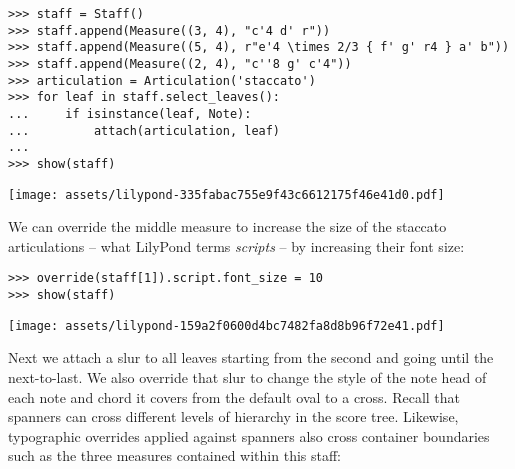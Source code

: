 \begin{abjadbookoutput}
\begin{singlespacing}
\vspace{-0.5\baselineskip}
\begin{verbatim}
>>> staff = Staff()
>>> staff.append(Measure((3, 4), "c'4 d' r"))
>>> staff.append(Measure((5, 4), r"e'4 \times 2/3 { f' g' r4 } a' b"))
>>> staff.append(Measure((2, 4), "c''8 g' c'4"))
>>> articulation = Articulation('staccato')
>>> for leaf in staff.select_leaves():
...     if isinstance(leaf, Note):
...         attach(articulation, leaf)
...
>>> show(staff)
\end{verbatim}
\noindent\texttt{[image: assets/lilypond-335fabac755e9f43c6612175f46e41d0.pdf]}
\end{singlespacing}
\end{abjadbookoutput}

\noindent We can override the middle measure to increase the size of the
staccato articulations -- what LilyPond terms \emph{scripts} -- by increasing
their font size:

\begin{comment}
<abjad>
override(staff[1]).script.font_size = 10
show(staff)
</abjad>
\end{comment}

\begin{abjadbookoutput}
\begin{singlespacing}
\vspace{-0.5\baselineskip}
\begin{verbatim}
>>> override(staff[1]).script.font_size = 10
>>> show(staff)
\end{verbatim}
\noindent\texttt{[image: assets/lilypond-159a2f0600d4bc7482fa8d8b96f72e41.pdf]}
\end{singlespacing}
\end{abjadbookoutput}

\noindent Next we attach a slur to all leaves starting from the second and
going until the next-to-last. We also override that slur to change the style of
the note head of each note and chord it covers from the default oval to a
cross. Recall that spanners can cross different levels of hierarchy in the
score tree. Likewise, typographic overrides applied against spanners also
cross container boundaries such as the three measures contained within this
staff:

\begin{comment}
<abjad>
slur = spannertools.Slur(direction=Down)
attach(slur, staff.select_leaves()[1:-1])
override(slur).note_head.style = 'cross'
show(staff)
</abjad>
\end{comment}

